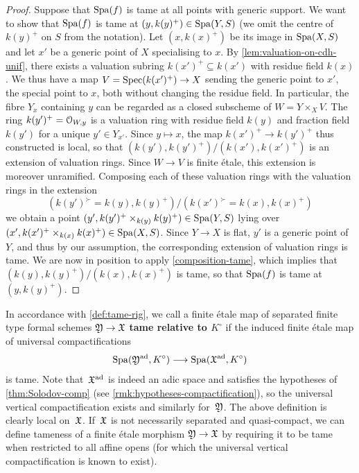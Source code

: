 \begin{proof}
Suppose that $\operatorname{Spa}(f)$ is tame at all points with generic support.
We want to show that $\operatorname{Spa}(f)$ is tame at $(y,k(y)^+)\in \operatorname{Spa}(Y, S)$ (we omit the centre of $k(y)^+$ on $S$ from the notation). Let $(x, k(x)^+)$ be its image in $\operatorname{Spa}(X, S)$ and let $x'$ be a generic point of $X$ specialising to $x$. By \cref{lem:valuation-on-cdh-unif}, there exists a valuation subring $k(x')^+\subseteq k(x')$ with residue field $k(x)$. We thus have a map $V=\operatorname{Spec}(k(x')^+)\to X$ sending the generic point to $x'$, the special point to $x$, both without changing the residue field. In particular, the fibre $Y_x$ containing $y$ can be regarded as a closed subscheme of $W = Y\times_X V$. The ring $k(y')^+ = {\mathcal O}_{W,y}$ is a valuation ring with residue field $k(y)$ and fraction field $k(y')$ for a unique $y'\in Y_{x'}$. Since $y\mapsto x$, the map $k(x')^+\to k(y')^+$ thus constructed is local, so that $(k(y'), k(y')^+)/(k(x'), k(x')^+)$ is an extension of valuation rings. Since $W\to V$ is finite \'etale, this extension is moreover unramified. Composing each of these valuation rings with the valuation rings in the extension 
\[
    (k(y')^\succ=k(y), k(y)^+)  /  (k(x')^\succ = k(x), k(x)^+)
\]
we obtain a point $(y', k(y')^+\times_{k(y)} k(y)^+)\in \operatorname{Spa}(Y, S)$ lying over $(x', k(x')^+\times_{k(x)} k(x)^+)\in \operatorname{Spa}(X, S)$. Since $Y\to X$ is flat, $y'$ is a generic point of $Y$, and thus by our assumption, the corresponding extension of valuation rings is tame. We are now in position to apply \cref{composition-tame}, which implies that $(k(y), k(y)^+)/(k(x),k(x)^+)$ is tame, so that $\operatorname{Spa}(f)$ is tame at $(y, k(y)^+)$.
\end{proof}


In accordance with \cref{def:tame-rig}, we call a finite \'etale  map of separated finite type formal schemes ${\mathfrak{Y}}\to {\mathfrak{X}}$ {\bf tame relative to $K^\circ$} if the induced finite \'etale map of universal compactifications
\[
    \operatorname{Spa}({\mathfrak{Y}}^{\rm ad}, K^\circ) \longrightarrow \operatorname{Spa}({\mathfrak{X}}^{\rm ad}, K^\circ)
\]
is tame.
Note that~${\mathfrak{X}}^{\rm ad}$ is indeed an adic space and satisfies the hypotheses of \cref{thm:Solodov-comp} (see \cref{rmk:hypotheses-compactification}), so the universal vertical compactification exists and similarly for~${\mathfrak{Y}}$.
The above definition is clearly local on~${\mathfrak{X}}$.
If~${\mathfrak{X}}$ is not necessarily separated and quasi-compact, we can define tameness of a finite étale morphism ${\mathfrak{Y}} \to {\mathfrak{X}}$ by requiring it to be tame when restricted to all affine opens (for which the universal vertical compactification is known to exist).


